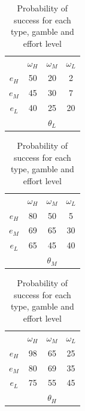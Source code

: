 \documentclass[
  12pt,
]{article}
\begin{document}
\begin{table}[htbp]
\centering

\begin{tabular}{ c|c|c|c|}
  
  \multicolumn{1}{c}{} & \multicolumn{1}{c}{$\omega_H$} & \multicolumn{1}{c}{$\omega_M$} & \multicolumn{1}{c}{$\omega_L$}\\
  \cline{2-4}
  $e_H$ & 50 & 20 & 2 \\
  \cline{2-4}
  $e_M$ & 45 & 30 & 7 \\
  \cline{2-4}
  $e_L$ & 40 & 25 & 20 \\

  \cline{2-4}
  \multicolumn{1}{c}{} & \multicolumn{1}{c}{} & \multicolumn{1}{c}{$\theta_L$} & \multicolumn{1}{c}{}\\
\end{tabular}
\hspace{.3cm} 
\begin{tabular}{ c|c|c|c|}
  
  \multicolumn{1}{c}{} & \multicolumn{1}{c}{$\omega_H$} & \multicolumn{1}{c}{$\omega_M$} & \multicolumn{1}{c}{$\omega_L$}\\
  \cline{2-4}
  $e_H$ & 80 & 50 & 5 \\
  \cline{2-4}
  $e_M$ & 69 & 65 & 30 \\
  \cline{2-4}
  $e_L$ & 65 & 45 & 40 \\
  \cline{2-4}
  \multicolumn{1}{c}{} & \multicolumn{1}{c}{} & \multicolumn{1}{c}{$\theta_M$} & \multicolumn{1}{c}{}\\
\end{tabular}
\hspace{.3cm} 
\begin{tabular}{ c|c|c|c|}
  
  \multicolumn{1}{c}{} & \multicolumn{1}{c}{$\omega_H$} & \multicolumn{1}{c}{$\omega_M$} & \multicolumn{1}{c}{$\omega_L$}\\
  \cline{2-4}
  $e_H$ & 98 & 65 & 25 \\
  \cline{2-4}
  $e_M$ & 80 & 69 & 35 \\
  \cline{2-4}
  $e_L$ & 75 & 55 & 45 \\
  \cline{2-4}
  \multicolumn{1}{c}{} & \multicolumn{1}{c}{} & \multicolumn{1}{c}{$\theta_H$} & \multicolumn{1}{c}{}\\
\end{tabular}

\caption{Probability of success for each type, gamble and effort level}
\label{tab:DGP}
\end{table}
\end{document}

